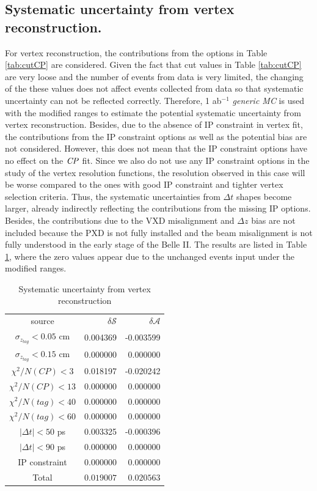 \subsection{Systematic uncertainty from vertex reconstruction.}
For vertex reconstruction, the contributions from the options in Table \ref{tab:cutCP} are considered. Given the fact that cut values in Table \ref{tab:cutCP} are very loose and the number of events from data is very limited, the changing of the these values does not affect events collected from data so that systematic uncertainty can not be reflected correctly. Therefore, 1 ab$^{-1}$ \textit{generic MC} is used with the modified ranges to estimate the potential systematic uncertainty from vertex reconstruction. Besides, due to the absence of IP constraint in vertex fit, the contributions from the IP constraint options as well as the potential bias are not considered. However, this does not mean that the IP constraint options have no effect on the $\it{CP}$ fit. Since we also do not use any IP constraint options in the study of the vertex resolution functions, the resolution observed in this case will be worse compared to the ones with good IP constraint and tighter vertex selection criteria. Thus, the systematic uncertainties from $\Delta t$ shapes become larger, already indirectly reflecting the contributions from the missing IP options. Besides, the contributions due to the VXD misalignment and $\Delta z$ bias are not included because the PXD is not fully installed and the beam misalignment is not fully understood in the early stage of the Belle II.
The results are listed in Table \ref{tab:sy_vertex}, where the zero values appear due to the unchanged events input under the modified ranges.

\begin{table}[htpb]
	\begin{minipage}[b]{1.0\linewidth}
		\centering
		\caption{Systematic uncertainty from vertex reconstruction}
		\label{tab:sy_vertex}
		\begin{tabular}{c r r}
			\hline
			source & $\delta \mathcal{S}$ & $\delta \mathcal{A}$ \\
			$\sigma_{z_{tag}}<0.05$ cm & 0.004369
& -0.003599
\\
			$\sigma_{z_{tag}}<0.15$ cm & 0.000000 & 0.000000 \\
			$\chi^2/N(CP)<3$ & 0.018197
& -0.020242
\\
			$\chi^2/N(CP)<13$ & 0.000000 & 0.000000\\
			$\chi^2/N(tag)<40$ & 0.000000
& 0.000000
\\
			$\chi^2/N(tag)<60$ & 0.000000 & 0.000000\\
			$|\Delta t|<50 $ ps & 0.003325
& -0.000396
\\
			$|\Delta t|<90 $ ps & 0.000000 & 0.000000\\
			IP constraint & 0.000000& 0.000000\\
						\hline
							Total &
						{$0.019007$} &
						{$0.020563$}\\
						\hline
		\end{tabular}
	\end{minipage}
\end{table}

